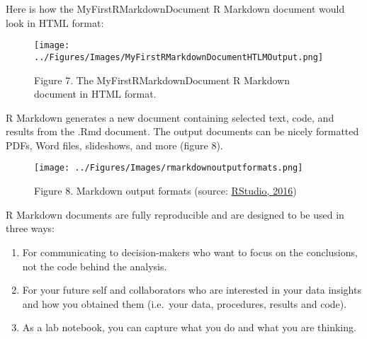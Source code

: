 \documentclass[
]{article}
\begin{document}
Here is how the MyFirstRMarkdownDocument R Markdown document would look
in HTML format:

\begin{figure}
\centering
\texttt{[image: ../Figures/Images/MyFirstRMarkdownDocumentHTLMOutput.png]}
\caption{Figure 7. The MyFirstRMarkdownDocument R Markdown document in
HTML format.}
\end{figure}

R Markdown generates a new document containing selected text, code, and
results from the .Rmd document. The output documents can be nicely
formatted PDFs, Word files, slideshows, and more (figure 8).

\begin{figure}
\centering
\texttt{[image: ../Figures/Images/rmarkdownoutputformats.png]}
\caption{Figure 8. Markdown output formats (source:
\href{https://eu01.alma.exlibrisgroup.com/leganto/public/44UOE_INST/citation/37711529450002466?auth=SAML}{RStudio,
2016})}
\end{figure}

R Markdown documents are fully reproducible and are designed to be used
in three ways:

\begin{enumerate}
\def\labelenumi{\arabic{enumi}.}
\item
  For communicating to decision-makers who want to focus on the
  conclusions, not the code behind the analysis.
\item
  For your future self and collaborators who are interested in your data
  insights and how you obtained them (i.e.~your data, procedures,
  results and code).
\item
  As a lab notebook, you can capture what you do and what you are
  thinking.
\end{enumerate}
\end{document}
